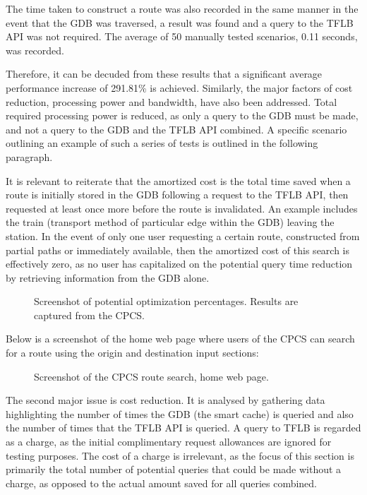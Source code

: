 \documentclass[12pt]{article}   	%
\begin{document}
The time taken to construct a route was also recorded in the same manner in the event that the GDB was traversed, a result was found and a query to the TFLB API was not required. The average of 50 manually tested scenarios, 0.11 seconds, was recorded.

Therefore, it can be decuded from these results that a significant average performance increase of 291.81\% is achieved. Similarly, the major factors of cost reduction, processing power and bandwidth, have also been addressed. Total required processing power is reduced, as only a query to the GDB must be made, and not a query to the GDB and the TFLB API combined. A specific scenario outlining an example of such a series of tests is outlined in the following paragraph.

It is relevant to reiterate that the amortized cost is the total time saved when a route is initially stored in the GDB following a request to the TFLB API, then requested at least once more before the route is invalidated. An example includes the train (transport method of particular edge within the GDB) leaving the station. In the event of only one user requesting a certain route, constructed from partial paths or immediately available, then the amortized cost of this search is effectively zero, as no user has capitalized on the potential query time reduction by retrieving information from the GDB alone.

\noindent
\hfill
\begin{figure}[htp]

\hfill

\caption{Screenshot of potential optimization percentages. Results are captured from the CPCS.}
\end{figure}
\hfill

\newpage

\noindent
Below is a screenshot of the home web page where users of the CPCS can search for a route using the origin and destination input sections:

\noindent
\hfill
\begin{figure}[htp]

\hfill
\caption{Screenshot of the CPCS route search, home web page.}
\end{figure}

\newpage

The second major issue is cost reduction. It is analysed by gathering data highlighting the number of times the GDB (the smart cache) is queried and also the number of times that the TFLB API is queried. A query to TFLB is regarded as a charge, as the initial complimentary request allowances are ignored for testing purposes. The cost of a charge is irrelevant, as the focus of this section is primarily the total number of potential queries that could be made without a charge, as opposed to the actual amount saved for all queries combined.
\end{document}
